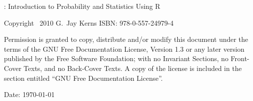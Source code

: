 

\setcounter{page}{2}

\noindent \IPSUR: Introduction to Probability and Statistics Using \textsf{R}

\noindent Copyright \textcopyright~2010 G.~Jay Kerns
\noindent ISBN: 978-0-557-24979-4
\medskip{}


\noindent Permission is granted to copy, distribute and/or modify
this document under the terms of the GNU Free Documentation License,
Version 1.3 or any later version published by the Free Software Foundation;
with no Invariant Sections, no Front-Cover Texts, and no Back-Cover
Texts. A copy of the license is included in the section entitled ``GNU
Free Documentation License''.

\noindent \bigskip{}
\noindent Date: \today
\noindent \vfill{}

\cleardoublepage
{}
{}

\tableofcontents{}


